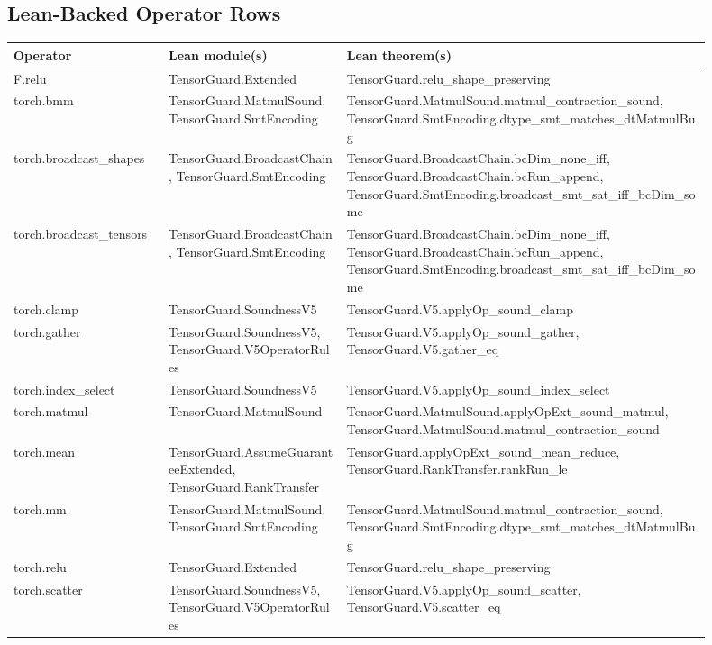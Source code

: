 \documentclass[10pt]{article}
\begin{document}
\subsection{Lean-Backed Operator Rows}
\begin{longtable}{|p{0.20\linewidth}|p{0.23\linewidth}|p{0.47\linewidth}|}
\hline
\textbf{Operator} & \textbf{Lean module(s)} & \textbf{Lean theorem(s)} \\
\hline
F.relu & TensorGuard.Extended & TensorGuard.relu\_shape\_preserving \\
\hline
torch.bmm & TensorGuard.MatmulSound, TensorGuard.SmtEncoding & TensorGuard.MatmulSound.matmul\_contraction\_sound, TensorGuard.SmtEncoding.dtype\_smt\_matches\_dtMatmulBug \\
\hline
torch.broadcast\_shapes & TensorGuard.BroadcastChain, TensorGuard.SmtEncoding & TensorGuard.BroadcastChain.bcDim\_none\_iff, TensorGuard.BroadcastChain.bcRun\_append, TensorGuard.SmtEncoding.broadcast\_smt\_sat\_iff\_bcDim\_some \\
\hline
torch.broadcast\_tensors & TensorGuard.BroadcastChain, TensorGuard.SmtEncoding & TensorGuard.BroadcastChain.bcDim\_none\_iff, TensorGuard.BroadcastChain.bcRun\_append, TensorGuard.SmtEncoding.broadcast\_smt\_sat\_iff\_bcDim\_some \\
\hline
torch.clamp & TensorGuard.SoundnessV5 & TensorGuard.V5.applyOp\_sound\_clamp \\
\hline
torch.gather & TensorGuard.SoundnessV5, TensorGuard.V5OperatorRules & TensorGuard.V5.applyOp\_sound\_gather, TensorGuard.V5.gather\_eq \\
\hline
torch.index\_select & TensorGuard.SoundnessV5 & TensorGuard.V5.applyOp\_sound\_index\_select \\
\hline
torch.matmul & TensorGuard.MatmulSound & TensorGuard.MatmulSound.applyOpExt\_sound\_matmul, TensorGuard.MatmulSound.matmul\_contraction\_sound \\
\hline
torch.mean & TensorGuard.AssumeGuaranteeExtended, TensorGuard.RankTransfer & TensorGuard.applyOpExt\_sound\_mean\_reduce, TensorGuard.RankTransfer.rankRun\_le \\
\hline
torch.mm & TensorGuard.MatmulSound, TensorGuard.SmtEncoding & TensorGuard.MatmulSound.matmul\_contraction\_sound, TensorGuard.SmtEncoding.dtype\_smt\_matches\_dtMatmulBug \\
\hline
torch.relu & TensorGuard.Extended & TensorGuard.relu\_shape\_preserving \\
\hline
torch.scatter & TensorGuard.SoundnessV5, TensorGuard.V5OperatorRules & TensorGuard.V5.applyOp\_sound\_scatter, TensorGuard.V5.scatter\_eq \\

\end{longtable}
\end{document}
